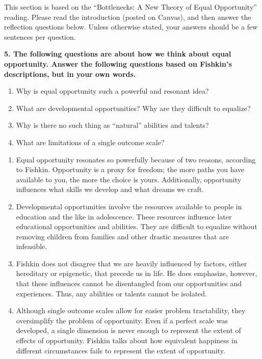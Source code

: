 \documentclass{article}
\begin{document}
This section is based on the ``Bottlenecks: A New Theory of Equal Opportunity'' reading. Please read the introduction (posted on Canvas), and then answer the reflection questions below. Unless otherwise stated, your answers should be a few sentences per question.

\textbf{5. The following questions are about how we think about equal opportunity. Answer the following questions based on Fishkin's descriptions, but in your own words.}
\begin{enumerate}[label=\Alph*.]
    \item Why is equal opportunity such a powerful and resonant idea?
    \item What are developmental opportunities? Why are they difficult to equalize?
    \item Why is there no such thing as ``natural'' abilities and talents?
    \item What are limitations of a single outcome scale?
\end{enumerate}

\bigskip
\begin{mdframed}
\begin{enumerate}[label=\Alph*.]
\item Equal opportunity resonates so powerfully because of two reasons, according to Fishkin. Opportunity is a proxy for freedom; the more paths you have available to you, the more the choice is yours. Additionally, opportunity influences what skills we develop and what dreams we craft.
\item Developmental opportunities involve the resources available to people in education and the like in adolescence. These resources influence later educational opportunities and abilities. They are difficult to equalize without removing children from families and other  drastic measures that are infeasible. 
\item Fishkin does not disagree that we are heavily influenced by factors, either hereditary or epigenetic, that precede us in life. He does emphasize, however, that these influences cannot be disentangled from our opportunities and experiences. Thus, any abilities or talents cannot be isolated.  
\item Although single outcome scales allow for easier problem tractability, they oversimplify the problem of opportunity. Even if a perfect scale was developed, a single dimension is never enough to represent the extent of effects of opportunity. Fishkin talks about how equivalent happiness in different circumstances fails to represent the extent of opportunity. 
\end{enumerate}
\end{mdframed}
\bigskip
\end{document}
